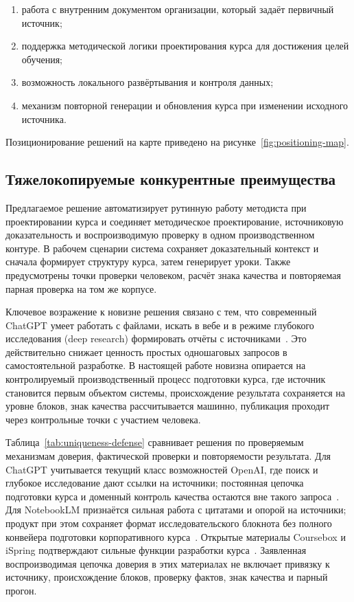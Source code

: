 \begin{enumerate}
  \item работа с внутренним документом организации, который задаёт
    первичный источник;
  \item поддержка методической логики проектирования курса для достижения целей обучения;
  \item возможность локального развёртывания и контроля данных;
  \item механизм повторной генерации и обновления курса при изменении
    исходного источника.
\end{enumerate}

Позиционирование решений на карте приведено на рисунке~\ref{fig:positioning-map}.



\subsection{Тяжелокопируемые конкурентные преимущества}

Предлагаемое решение автоматизирует рутинную работу методиста при
проектировании курса и соединяет методическое проектирование,
источниковую доказательность и воспроизводимую проверку в одном
производственном контуре. В рабочем сценарии система сохраняет
доказательный контекст и сначала формирует структуру курса, затем
генерирует уроки. Также предусмотрены точки проверки человеком, расчёт
знака качества и повторяемая парная проверка на том же корпусе.

Ключевое возражение к новизне решения связано с тем, что современный
ChatGPT умеет работать с файлами, искать в вебе и в режиме
глубокого исследования (deep research) формировать отчёты
с источниками~\cite{chatgpt_deep_research_2026}.
Это действительно снижает ценность простых одношаговых запросов
в самостоятельной разработке. В настоящей работе новизна опирается
на контролируемый производственный процесс подготовки курса, где
источник становится первым объектом системы, происхождение результата
сохраняется на уровне блоков, знак качества рассчитывается машинно,
публикация проходит через контрольные точки с участием человека.

Таблица~\ref{tab:uniqueness-defense} сравнивает решения по проверяемым
механизмам доверия, фактической проверки и повторяемости результата.
Для ChatGPT учитывается текущий класс
возможностей OpenAI, где поиск и глубокое исследование дают ссылки на источники;
постоянная цепочка подготовки курса и доменный контроль качества остаются
вне такого запроса~\cite{chatgpt_deep_research_2026,chatgpt_accuracy_2026}. Для
NotebookLM признаётся сильная работа с цитатами и опорой на источники;
продукт при этом сохраняет формат исследовательского блокнота без полного
конвейера подготовки корпоративного курса~\cite{notebooklm_chat_2026}.
Открытые материалы Coursebox и iSpring подтверждают сильные функции
разработки курса~\cite{coursebox_ai_2024,ispring_suite_ai_2026}.
Заявленная воспроизводимая цепочка доверия в этих материалах не включает
привязку к источнику, происхождение блоков, проверку фактов,
знак качества и парный прогон.

